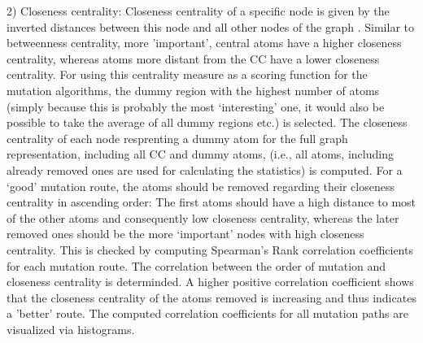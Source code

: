 2) Closeness centrality: Closeness centrality of a specific node is
given by the inverted distances between this node and all other nodes
of the graph \cite{Newman.2010}. Similar to betweenness centrality, more 'important', central atoms have a higher closeness centrality, whereas atoms more distant from the CC have a lower
closeness centrality.
For using this centrality measure as a scoring function for the mutation
algorithms, the dummy region with the highest number of atoms (simply
because this is probably the most \textquoteleft interesting\textquoteright{}
one, it would also be possible to take the average of all dummy regions
etc.) is selected. The closeness centrality of each node resprenting a dummy atom for
the full graph representation, including all CC and dummy atoms, (i.e., all atoms, including already removed ones are used for calculating the statistics) is
computed. For a ‘good’ mutation route, the atoms should be removed regarding their closeness centrality in ascending order: The first atoms should have a high distance to most of the other atoms and consequently low closeness centrality, whereas the later removed ones should be the more ‘important’ nodes with high closeness centrality. This is checked by computing Spearman's Rank correlation coefficients for each mutation route. The correlation between the order of mutation and closeness centrality is determinded. A higher positive correlation coefficient shows that the
closeness centrality of the atoms removed is increasing and thus indicates a 'better' route. The computed correlation coefficients for all mutation paths are visualized via histograms. 

